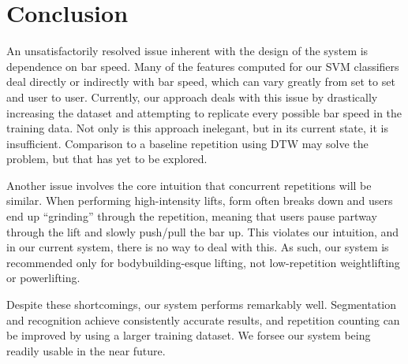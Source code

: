 \chapter{Conclusion}

An unsatisfactorily resolved issue inherent with the design of the system is dependence on bar speed. Many of the features computed for our SVM classifiers deal directly or indirectly with bar speed, which can vary greatly from set to set and user to user. Currently, our approach deals with this issue by drastically increasing the dataset and attempting to replicate every possible bar speed in the training data. Not only is this approach inelegant, but in its current state, it is insufficient. Comparison to a baseline repetition using DTW may solve the problem, but that has yet to be explored.

Another issue involves the core intuition that concurrent repetitions will be similar. When performing high-intensity lifts, form often breaks down and users end up ``grinding'' through the repetition, meaning that users pause partway through the lift and slowly push/pull the bar up. This violates our intuition, and in our current system, there is no way to deal with this. As such, our system is recommended only for bodybuilding-esque lifting, not low-repetition weightlifting or powerlifting.

Despite these shortcomings, our system performs remarkably well. Segmentation and recognition achieve consistently accurate results, and repetition counting can be improved by using a larger training dataset. We forsee our system being readily usable in the near future. 